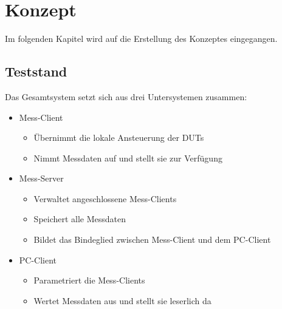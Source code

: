 \chapter{Konzept}
\label{chapter_Konzept}

Im folgenden Kapitel wird auf die Erstellung des Konzeptes eingegangen.

\section{Teststand}
\label{section_Teststand}

Das Gesamtsystem setzt sich aus drei Untersystemen zusammen:

\begin{itemize}

\item Mess-Client
\begin{itemize}
\item Übernimmt die lokale Ansteuerung der \acp{DUT}
\item Nimmt Messdaten auf und stellt sie zur Verfügung
\end{itemize}

\item Mess-Server
\begin{itemize}
\item Verwaltet angeschlossene Mess-Clients
\item Speichert alle Messdaten
\item Bildet das Bindeglied zwischen Mess-Client und dem PC-Client
\end{itemize}

\item PC-Client
\begin{itemize}
\item Parametriert die Mess-Clients
\item Wertet Messdaten aus und stellt sie leserlich da
\end{itemize}

\end{itemize}


